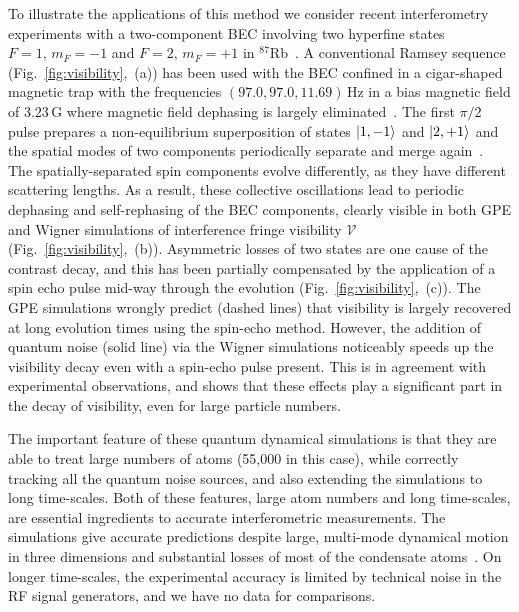 \documentclass[aps,prl,twocolumn,showpacs,amsmath,amssymb,superscriptaddress,flushbottom,noraggedfooter]{revtex4-1}
\newcommand{\Rb}{$^{87}$Rb}
\newcommand{\figref}[1]{Fig.~\ref{#1}}
\newcommand{\ket}[1]{\mbox{\ensuremath{\vert #1 \rangle}}}
\begin{document}
To illustrate the applications of this method we consider recent interferometry
experiments with a two-component BEC involving two hyperfine states
${F=1,\, m_{F}=-1}$ and ${F=2,\, m_{F}=+1}$ in \Rb~\cite{Egorov2011}.
A conventional Ramsey sequence (\figref{fig:visibility},~(a)) has been used
with the BEC confined in a cigar-shaped magnetic trap with the frequencies $(97.0, 97.0, 11.69)\,\mathrm{Hz}$
in a bias magnetic field of $3.23\,\mathrm{G}$ where magnetic field dephasing is largely eliminated~\cite{Hall1998}.
The first $\pi/2$ pulse prepares a non-equilibrium superposition of states ${\ket{1,-1}}$ and ${\ket{2,+1}}$
and the spatial modes of two components periodically separate and merge again~\cite{Mertes2007}.
The spatially-separated spin components evolve differently, as they have
different scattering lengths.
As a result, these collective oscillations lead to periodic dephasing and
self-rephasing of the BEC components, clearly visible in both GPE and Wigner
simulations of interference fringe visibility
$\mathcal{V}$ (\figref{fig:visibility},~(b)).
Asymmetric losses of two states are one cause of the contrast decay, and
this has been partially compensated by the application of a spin echo pulse
mid-way through the evolution (\figref{fig:visibility},~(c)).
The GPE simulations wrongly predict (dashed lines) that visibility is largely
recovered at long evolution times using the spin-echo method.
However, the addition of quantum noise (solid line) via the Wigner simulations
noticeably speeds up the visibility decay even with a spin-echo pulse present.
This is in agreement with experimental observations, and shows that these
effects play a significant part in the decay of visibility, even for
large particle numbers.

The important feature of these quantum dynamical simulations
is that they are able to treat large numbers of atoms (55,000 in this case),
while correctly tracking all the quantum noise sources, and also extending the simulations to long time-scales.
Both of these features, large atom numbers and long time-scales,
are essential ingredients to accurate interferometric measurements.
The simulations give accurate predictions despite large, multi-mode dynamical motion in three dimensions
and substantial losses of most of the condensate atoms~\cite{Egorov2011}.
On longer time-scales, the experimental accuracy is limited by technical noise in the RF signal generators,
and we have no data for comparisons.
\end{document}
